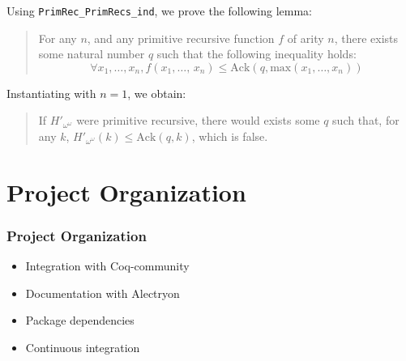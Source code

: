 \documentclass[10pt]{beamer}
\newcommand{\community}{Coq-community\xspace}
\newcommand{\alectr}{Alectryon\xspace}
\begin{document}
\begin{frame}
  \begin{block}{}
    Using  \texttt{PrimRec\_PrimRecs\_ind}, we prove the following lemma:
    
    \begin{quote}
      For any \textcolor{mathcolor}{$n$}, and any primitive recursive function \textcolor{mathcolor}{$f$} of  arity \textcolor{mathcolor}{$n$}, there exists some natural number \textcolor{mathcolor}{$q$} such that the following inequality holds:
      {\color{mathcolor}
        \[
          \forall x_1,\dots,x_n, 
          f(x_1,\dots,\,x_n)\leq\textrm{Ack}(q,\textrm{max}(x_1,\dots,x_n))
        \]}
    \end{quote}
  \end{block}


  \begin{block}{}

    Instantiating with \textcolor{mathcolor}{$n=1$}, we obtain:

    \begin{quote}
      If \textcolor{mathcolor}{$H'_{\omega^\omega}$} were primitive recursive, there would exists some \textcolor{mathcolor}{$q$} such that, for any \textcolor{mathcolor}{$k$}, \textcolor{mathcolor}{$H'_{\omega^\omega}(k) \leq\textrm{Ack}(q,k)$}, which is false.
    \end{quote}
    
  \end{block}
\end{frame}
\section{Project Organization}
\begin{frame}
  \frametitle{Project  Organization}
  \begin{itemize}
  \item Integration with \community
  \item Documentation with \alectr
  \item Package dependencies
  \item Continuous integration
  \end{itemize}
\end{frame}
\end{document}
